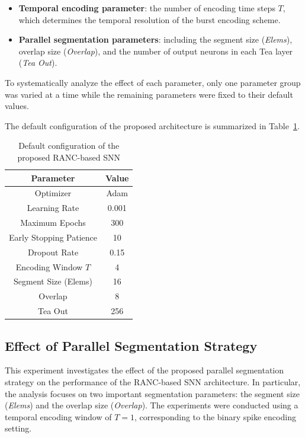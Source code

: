 \documentclass[../main.tex]{subfiles}
\begin{document}
\begin{itemize}
    \item \textbf{Temporal encoding parameter}: the number of encoding time steps \(T\), which determines the temporal resolution of the burst encoding scheme.
    
    \item \textbf{Parallel segmentation parameters}: including the segment size (\textit{Elems}), overlap size (\textit{Overlap}), and the number of output neurons in each Tea layer (\textit{Tea Out}).
\end{itemize}

To systematically analyze the effect of each parameter, only one parameter group was varied at a time while the remaining parameters were fixed to their default values.

The default configuration of the proposed architecture is summarized in Table~\ref{tab:ranc_default_config}.

\begin{table}[h]
\centering
\caption{Default configuration of the proposed RANC-based SNN}
\label{tab:ranc_default_config}
\begin{tabular}{|c|c|}
\hline
\textbf{Parameter} & \textbf{Value} \\ \hline
Optimizer & Adam \\ \hline
Learning Rate & 0.001 \\ \hline
Maximum Epochs & 300 \\ \hline
Early Stopping Patience & 10 \\ \hline
Dropout Rate & 0.15 \\ \hline
Encoding Window \(T\) & 4 \\ \hline
Segment Size (Elems) & 16 \\ \hline
Overlap & 8 \\ \hline
Tea Out & 256 \\ \hline
\end{tabular}
\end{table}

\subsection{Effect of Parallel Segmentation Strategy}

This experiment investigates the effect of the proposed parallel segmentation strategy on the performance of the RANC-based SNN architecture. In particular, the analysis focuses on two important segmentation parameters: the segment size (\textit{Elems}) and the overlap size (\textit{Overlap}). The experiments were conducted using a temporal encoding window of \(T=1\), corresponding to the binary spike encoding setting.
\end{document}
